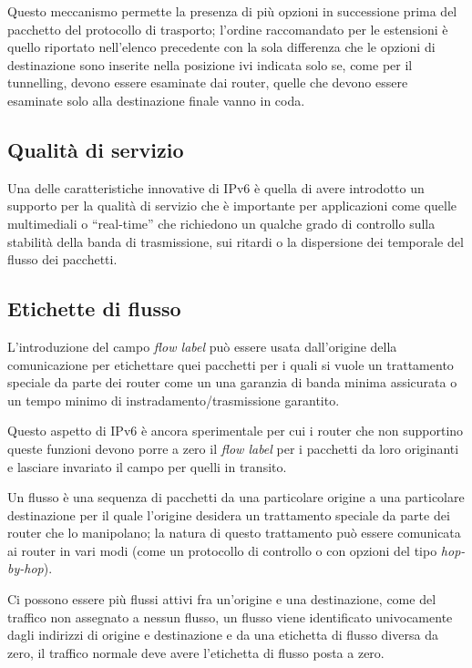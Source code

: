 Questo meccanismo permette la presenza di più opzioni in successione prima
del pacchetto del protocollo di trasporto; l'ordine raccomandato per le
estensioni è quello riportato nell'elenco precedente con la sola differenza
che le opzioni di destinazione sono inserite nella posizione ivi indicata solo
se, come per il tunnelling, devono essere esaminate dai router, quelle che
devono essere esaminate solo alla destinazione finale vanno in coda.


\subsection{Qualità di servizio}
\label{sec:IP_ipv6_qos}

Una delle caratteristiche innovative di IPv6 è quella di avere introdotto un
supporto per la qualità di servizio che è importante per applicazioni come
quelle multimediali o ``real-time'' che richiedono un qualche grado di
controllo sulla stabilità della banda di trasmissione, sui ritardi o la
dispersione dei temporale del flusso dei pacchetti.


\subsection{Etichette di flusso}
\label{sec:IP_ipv6_flow}
L'introduzione del campo \textit{flow label} può essere usata dall'origine
della comunicazione per etichettare quei pacchetti per i quali si vuole un
trattamento speciale da parte dei router come un una garanzia di banda minima
assicurata o un tempo minimo di instradamento/trasmissione garantito.

Questo aspetto di IPv6 è ancora sperimentale per cui i router che non
supportino queste funzioni devono porre a zero il \textit{flow label} per i
pacchetti da loro originanti e lasciare invariato il campo per quelli in
transito.

Un flusso è una sequenza di pacchetti da una particolare origine a una
particolare destinazione per il quale l'origine desidera un trattamento
speciale da parte dei router che lo manipolano; la natura di questo
trattamento può essere comunicata ai router in vari modi (come un protocollo
di controllo o con opzioni del tipo \textit{hop-by-hop}). 

Ci possono essere più flussi attivi fra un'origine e una destinazione, come
del traffico non assegnato a nessun flusso, un flusso viene identificato
univocamente dagli indirizzi di origine e destinazione e da una etichetta di
flusso diversa da zero, il traffico normale deve avere l'etichetta di flusso
posta a zero.

